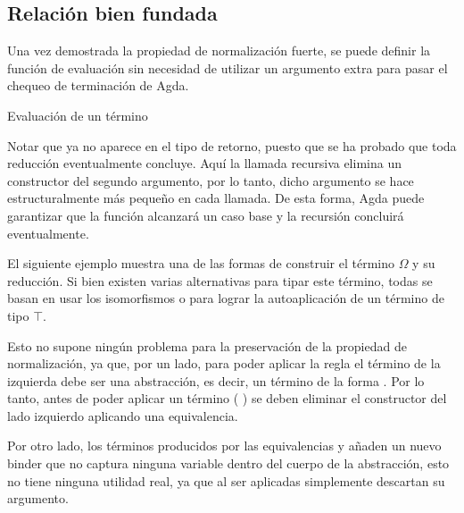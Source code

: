 


\subsection{Relación bien fundada}

Una vez demostrada la propiedad de normalización fuerte, se puede definir la función de evaluación sin necesidad de utilizar un argumento extra para pasar el chequeo de terminación de Agda.
  
\begin{codigo}
	Evaluación de un término
\end{codigo}

Notar que ya no aparece  en el tipo de retorno, puesto que se ha probado que toda reducción eventualmente concluye.
Aquí la llamada recursiva elimina un constructor  del segundo argumento, por lo tanto, dicho argumento se hace estructuralmente más pequeño en cada llamada.
De esta forma, Agda puede garantizar que la función alcanzará un caso base y la recursión concluirá eventualmente.

\begin{example}
	El siguiente ejemplo muestra una de las formas de construir el término $\Omega$ y su reducción.
	Si bien existen varias alternativas para tipar este término, todas se basan en usar los isomorfismos  o  para lograr la autoaplicación de un término de tipo $\top$.
	
	Esto no supone ningún problema para la preservación de la propiedad de normalización, ya que, por un lado, para poder aplicar la regla  el término de la izquierda debe ser una abstracción, es decir, un término de la forma  .
	Por lo tanto, antes de poder aplicar un término (\const{[}  \const{]≡} )   se deben eliminar el constructor  del lado izquierdo aplicando una equivalencia.
	
	Por otro lado, los términos producidos por las equivalencias  y  añaden un nuevo binder que no captura ninguna variable dentro del cuerpo de la abstracción, esto no tiene ninguna utilidad real, ya que al ser aplicadas simplemente descartan su argumento.
	
\end{example}

